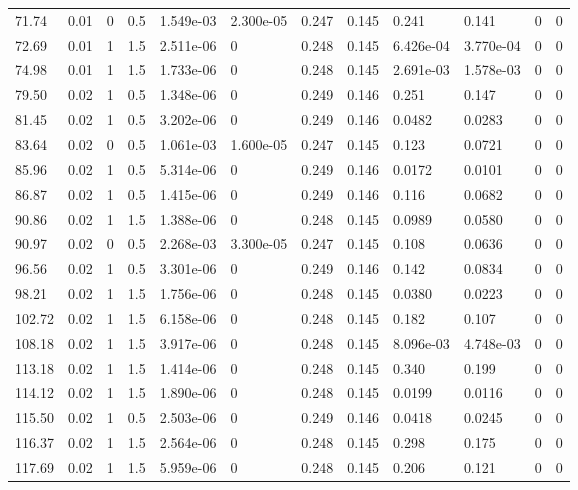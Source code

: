 \documentclass[preview]{standalone}
\begin{document}
{{\begin{tabular}{L{1.2cm}C{1.2cm} C{0.3cm}C{0.5cm} C{1.4cm}C{1.4cm} C{1.4cm}C{1.4cm} C{1.6cm}C{1.6cm} C{1.6cm}C{1.6cm}}
  71.74  &  0.01  & 0     & 0.5 &  1.549e-03  & 2.300e-05  &  0.247&   0.145& 0.241 & 0.141   &  0 & 0  \\ 
  72.69  &  0.01  & 1     & 1.5 &  2.511e-06  & 0  &  0.248&   0.145& 6.426e-04 & 3.770e-04   &  0 & 0  \\ 
  74.98  &  0.01  & 1     & 1.5 &  1.733e-06  & 0  &  0.248&   0.145& 2.691e-03 & 1.578e-03   &  0 & 0  \\ 
  79.50  &  0.02  & 1     & 0.5 &  1.348e-06  & 0  &  0.249&   0.146& 0.251 & 0.147   &  0 & 0  \\ 
  81.45  &  0.02  & 1     & 0.5 &  3.202e-06  & 0  &  0.249&   0.146& 0.0482 & 0.0283   &  0 & 0  \\ 
  83.64  &  0.02  & 0     & 0.5 &  1.061e-03  & 1.600e-05  &  0.247&   0.145& 0.123 & 0.0721   &  0 & 0  \\ 
  85.96  &  0.02  & 1     & 0.5 &  5.314e-06  & 0  &  0.249&   0.146& 0.0172 & 0.0101   &  0 & 0  \\ 
  86.87  &  0.02  & 1     & 0.5 &  1.415e-06  & 0  &  0.249&   0.146& 0.116 & 0.0682   &  0 & 0  \\ 
  90.86  &  0.02  & 1     & 1.5 &  1.388e-06  & 0  &  0.248&   0.145& 0.0989 & 0.0580   &  0 & 0  \\ 
  90.97  &  0.02  & 0     & 0.5 &  2.268e-03  & 3.300e-05  &  0.247&   0.145& 0.108 & 0.0636   &  0 & 0  \\ 
  96.56  &  0.02  & 1     & 0.5 &  3.301e-06  & 0  &  0.249&   0.146& 0.142 & 0.0834   &  0 & 0  \\ 
  98.21  &  0.02  & 1     & 1.5 &  1.756e-06  & 0  &  0.248&   0.145& 0.0380 & 0.0223   &  0 & 0  \\ 
  102.72  &  0.02  & 1     & 1.5 &  6.158e-06  & 0  &  0.248&   0.145& 0.182 & 0.107   &  0 & 0  \\ 
  108.18  &  0.02  & 1     & 1.5 &  3.917e-06  & 0  &  0.248&   0.145& 8.096e-03 & 4.748e-03   &  0 & 0  \\ 
  113.18  &  0.02  & 1     & 1.5 &  1.414e-06  & 0  &  0.248&   0.145& 0.340 & 0.199   &  0 & 0  \\ 
  114.12  &  0.02  & 1     & 1.5 &  1.890e-06  & 0  &  0.248&   0.145& 0.0199 & 0.0116   &  0 & 0  \\ 
  115.50  &  0.02  & 1     & 0.5 &  2.503e-06  & 0  &  0.249&   0.146& 0.0418 & 0.0245   &  0 & 0  \\ 
  116.37  &  0.02  & 1     & 1.5 &  2.564e-06  & 0  &  0.248&   0.145& 0.298 & 0.175   &  0 & 0  \\ 
  117.69  &  0.02  & 1     & 1.5 &  5.959e-06  & 0  &  0.248&   0.145& 0.206 & 0.121   &  0 & 0  \\ 

\end{tabular}}}
\end{document}
